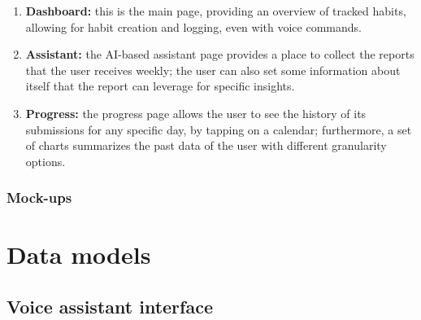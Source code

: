 \documentclass{article}
\begin{document}
\begin{enumerate}
    \item \textbf{Dashboard:} this is the main page, providing an overview of tracked habits, allowing for habit creation and logging, even with voice commands.
    \item \textbf{Assistant:} the AI-based assistant page provides a place to collect the reports that the user receives weekly; the user can also set some information about itself that the report can leverage for specific insights.
    \item \textbf{Progress:} the progress page allows the user to see the history of its submissions for any specific day, by tapping on a calendar; furthermore, a set of charts summarizes the past data of the user with different granularity options.
\end{enumerate}

\subsubsection{Mock-ups}



\newpage
\section{Data models}

\subsection{Voice assistant interface}
\end{document}
